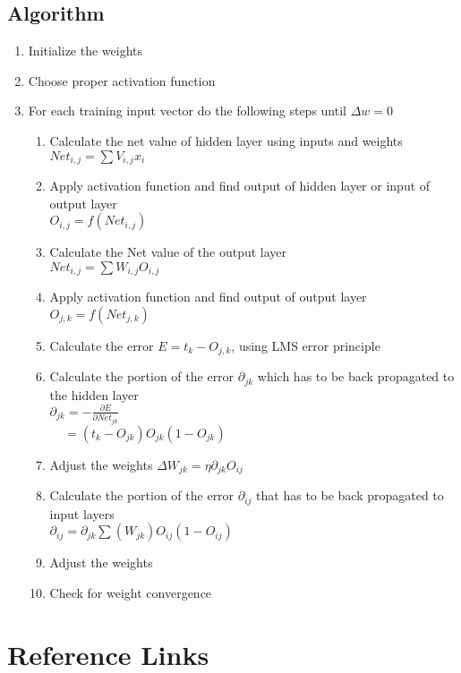 \section{Algorithm}
\begin{enumerate}
\item Initialize the weights
\item Choose proper activation function
\item For each training input vector do the following steps until $\Delta w = 0$
\begin{enumerate}
\item Calculate the net value of hidden layer using inputs and weights \\
$ Net_{i,j} = \sum V_{i,j}x_i $
\item Apply activation function and find output of hidden layer or input of output layer \\
$ O_{i,j} = f(Net_{i,j}) $
\item Calculate the Net value of the output layer \\
$ Net_{i,j} = \sum W_{i,j} O_{i,j} $
\item Apply activation function and find output of output layer \\
$ O_{j,k} = f(Net_{j,k}) $ 
\item Calculate the error $E = t_k - O_{j,k} $, using LMS error principle
\item Calculate the portion of the error $ \partial_{jk} $ which has to be back propagated to the hidden layer \\
$ \partial_{jk} = - \frac{\partial E}{\partial Net_{jk}} $ \\
$          ~~~~~= (t_k - O_{jk}) O_{jk}(1-O_{jk}) $
\item Adjust the weights $\Delta W_{jk} = \eta \partial_{jk} O_{ij} $
\item Calculate the portion of the error $ \partial_{ij} $ that has to be back propagated to input layers \\
$ \partial_{ij} = \partial_{jk} \sum (W_{jk})O_{ij}(1-O_{ij}) $
\item Adjust the weights 
\item Check for weight convergence
\end{enumerate}
\end{enumerate}


\chapter{Reference Links}

